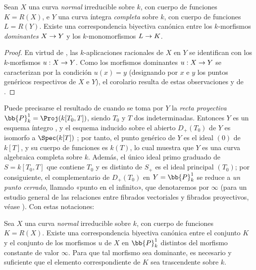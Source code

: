 \documentclass[oneside,10pt]{amsart}
\makeatletter
\newcommand{\ega@arrow}[2]{\mathchoice{#1}{#2}{#2}{#2}}
\renewcommand{\to}{\ega@arrow{\longrightarrow}{\rightarrow}}
\let\EGAOriginalLabel\label
\renewcommand{\label}[1]{\phantomsection\EGAOriginalLabel{#1}}
\makeatother
\begin{document}
\begin{corollary}[7.4.13]
\label{II.7.4.13}
Sean $X$ una curva \emph{normal} irreducible sobre $k$, con cuerpo de funciones $K=R(X)$, e $Y$ una curva íntegra \emph{completa} sobre $k$, con cuerpo de funciones $L=R(Y)$.
Existe una correspondencia biyectiva canónica entre los $k$-morfismos \emph{dominantes} $X\to Y$ y los $k$-monomorfismos $L\to K$.
\end{corollary}

\begin{proof}
En virtud de , las $k$-aplicaciones racionales de $X$ en $Y$ se identifican con los $k$-morfismos $u:X\to Y$.
Como los morfismos dominantes $u:X\to Y$ se caracterizan por la condición $u(x)=y$ (designando por $x$ e $y$ los puntos genéricos respectivos de $X$ e $Y$), el corolario resulta de estas observaciones y de .
\end{proof}

\begin{env}[7.4.14]
\label{II.7.4.14}
Puede precisarse el resultado de  cuando se toma por $Y$ la \emph{recta proyectiva} $\bb{P}_k^1=\Proj(k[T_0,T])$, siendo $T_0$ y $T$ dos indeterminadas.
Entonces $Y$ es un esquema íntegro , y el esquema inducido sobre el abierto $D_+(T_0)$ de $Y$ es isomorfo a $\Spec(k[T])$ ; por tanto, el punto genérico de $Y$ es el ideal $(0)$ de $k[T]$, y su cuerpo de funciones es $k(T)$, lo cual muestra que $Y$ es una curva algebraica completa sobre $k$.
Además, el único ideal primo graduado de $S=k[T_0,T]$ que contiene $T_0$ y es distinto de $S_+$ es el ideal principal $(T_0)$; por consiguiente, el complementario de $D_+(T_0)$ en $Y=\bb{P}_k^1$ se reduce a \emph{un punto cerrado}, llamado «punto en el infinito», que denotaremos por $\infty$ (para un estudio general de las relaciones entre fibrados vectoriales y fibrados proyectivos, véase ).
Con estas notaciones:
\end{env}

\begin{corollary}[7.4.15]
\label{II.7.4.15}
Sea $X$ una curva \emph{normal} irreducible sobre $k$, con cuerpo de funciones $K=R(X)$.
Existe una correspondencia biyectiva canónica entre el conjunto $K$ y el conjunto de los morfismos $u$ de $X$ en $\bb{P}_k^1$ distintos del morfismo constante de valor $\infty$.
Para que tal morfismo sea dominante, es necesario y suficiente que el elemento correspondiente de $K$ sea trascendente sobre $k$.
\end{corollary}
\end{document}
